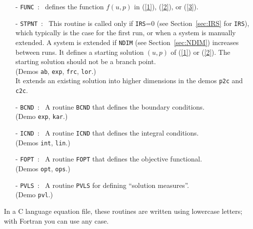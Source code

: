 \documentclass[12pt]{report}
\begin{document}
\begin{itemize}
\item[-] {\tt FUNC}~:~
  defines the function $f(u,p)$ in (\ref{1}), (\ref{2}), or (\ref{3}).
\item[-] {\tt STPNT}~:~
  This routine is called only if {\tt IRS}=0 
(see Section~\ref{sec:IRS} for {\tt IRS}),
  which typically is the case for the first run, or when a system
  is manually extended. A system is extended if {\tt NDIM} (see
  Section~\ref{sec:NDIM}) increases between runs.
  It defines a starting solution $(u,p)$ of (\ref{1}) or (\ref{2}).
  The starting solution should not be a branch point.\\
  (Demos {\tt ab}, {\tt exp}, {\tt frc}, {\tt lor}.)\\
  It extends an existing solution into higher dimensions in the demos
  {\tt p2c} and {\tt c2c}.
\item[-] {\tt BCND}~:~ 
  A routine {\tt BCND} that defines the boundary conditions. \\
  (Demo {\tt exp}, {\tt kar}.)
\item[-] {\tt ICND}~:~ 
  A routine {\tt ICND} that defines the integral conditions. \\ 
  (Demos {\tt int}, {\tt lin}.)  
\item[-] {\tt FOPT}~:~ 
  A routine {\tt FOPT} that defines the objective functional. \\ 
  (Demos {\tt opt}, {\tt ops}.)  
\item[-] {\tt PVLS}~:~
  A routine {\tt PVLS} for defining ``solution measures''. \\
  (Demo {\tt pvl}.)
\end{itemize}

In a C language equation file, these routines are written using
lowercase letters; with Fortran you can use any case.
 
\end{document}
